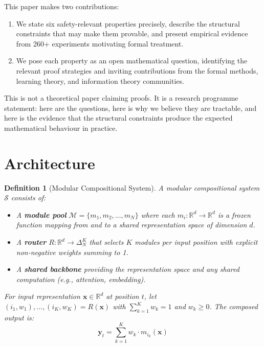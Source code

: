 \documentclass[11pt,a4paper]{article}
\newtheorem{definition}{Definition}
\begin{document}
This paper makes two contributions:
\begin{enumerate}[nosep]
  \item We state six safety-relevant properties precisely, describe the structural constraints that may make them provable, and present empirical evidence from 260+ experiments motivating formal treatment.
  \item We pose each property as an open mathematical question, identifying the relevant proof strategies and inviting contributions from the formal methods, learning theory, and information theory communities.
\end{enumerate}

\noindent This is not a theoretical paper claiming proofs.
It is a research programme statement: here are the questions, here is why we believe they are tractable, and here is the evidence that the structural constraints produce the expected mathematical behaviour in practice.

\section{Architecture}
\label{sec:arch}

\begin{definition}[Modular Compositional System]
A modular compositional system $\mathcal{S}$ consists of:
\begin{itemize}[nosep]
  \item A \textbf{module pool} $\mathcal{M} = \{m_1, m_2, \ldots, m_N\}$ where each $m_i : \mathbb{R}^d \to \mathbb{R}^d$ is a frozen function mapping from and to a shared representation space of dimension $d$.
  \item A \textbf{router} $R : \mathbb{R}^d \to \Delta^K_N$ that selects $K$ modules per input position with explicit non-negative weights summing to 1.
  \item A \textbf{shared backbone} providing the representation space and any shared computation (e.g., attention, embedding).
\end{itemize}
For input representation $\mathbf{x} \in \mathbb{R}^d$ at position $t$, let $(i_1, w_1), \ldots, (i_K, w_K) = R(\mathbf{x})$ with $\sum_{k=1}^{K} w_k = 1$ and $w_k \geq 0$. The composed output is:
\begin{equation}
\label{eq:composition}
\mathbf{y}_t = \sum_{k=1}^{K} w_k \cdot m_{i_k}(\mathbf{x})
\end{equation}
\end{definition}
\end{document}

